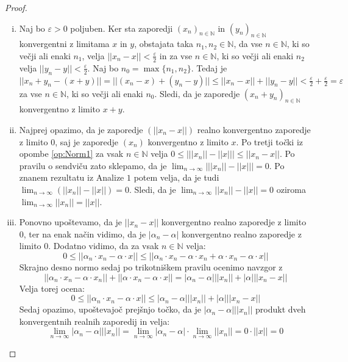 \documentclass[a4paper, 10pt]{article}
\newcounter{opombe}
\newcommand{\abs}[1]{\ensuremath{\lvert #1 \rvert}}
\newcommand{\mth}[1]{\ensuremath{\mathbb{#1}}}
\newcommand{\N}{\mth{N}}
\newcommand{\norm}[1]{\abs{\abs{#1}}}
\begin{document}
		\begin{proof}
				\begin{enumerate}[i)]
						\item Naj bo $\varepsilon > 0$ poljuben. Ker sta zaporedji $\left(x_n\right)_{n\in\N}$ in $\left(y_n\right)_{n\in\N}$ konvergentni z limitama $x$ in $y$, obstajata taka $n_1, n_2\in\N$, da vse $n\in\N$, ki so večji ali enaki $n_1$, velja $\norm{x_n - x} < \frac{\varepsilon}{2}$ in za vse $n\in\N$, ki so večji ali enaki $n_2$ velja $\norm{y_n - y} < \frac{\varepsilon}{2}$. Naj bo $n_0 = \max\{n_1, n_2\}$. Tedaj je $\norm{x_n + y_n - (x + y)} = \norm{(x_n - x) + (y_n - y)} \leq \norm{x_n - x} + \norm{y_n - y} < \frac{\varepsilon}{2} + \frac{\varepsilon}{2} = \varepsilon$ za vse $n\in\N$, ki so večji ali enaki $n_0$. Sledi, da je zaporedje $\left(x_n + y_n\right)_{n\in\N}$ konvergentno z limito $x + y$.
						\item Najprej opazimo, da je zaporedje $\left(\norm{x_n - x}\right)$ realno konvergentno zaporedje z limito $0$, saj je zaporedje $\left(x_n\right)$ konvergentno z limito $x$. Po tretji točki iz opombe \ref{op:Norm1} za vsak $n\in\N$ velja $0 \leq \abs{\norm{x_n} - \norm{x}} \leq \norm{x_n - x}$. Po pravilu o sendviču zato sklepamo, da je $\lim_{n\to\infty}\abs{\norm{x_n} - \norm{x}} = 0$. Po znanem rezultatu iz Analize $1$ potem velja, da je tudi $\lim_{n\to\infty}(\norm{x_n} - \norm{x}) = 0$. Sledi, da je $\lim_{n\to\infty}\norm{x_n} - \norm{x} = 0$ oziroma $\lim_{n\to\infty}\norm{x_n} = \norm{x}$.
						\item Ponovno upoštevamo, da je $\norm{x_n - x}$ konvergentno realno zaporedje z limito $0$, ter na enak način vidimo, da je $\abs{\alpha_n - \alpha}$ konvergentno realno zaporedje z limito $0$. Dodatno vidimo, da za vsak $n\in\N$ velja: $$0 \leq \norm{\alpha_n\cdot x_n - \alpha\cdot x} \leq \norm{\alpha_n\cdot x_n - \alpha\cdot x_n + \alpha\cdot x_n - \alpha\cdot x}$$
						Skrajno desno normo sedaj po trikotniškem pravilu ocenimo navzgor z $$\norm{\alpha_n\cdot x_n - \alpha\cdot x_n} + \norm{\alpha\cdot x_n - \alpha\cdot x}=\abs{\alpha_n - \alpha}\norm{x_n} + \abs{\alpha}\norm{x_n - x}$$ Velja torej ocena: \begin{equation}
								\label{eq:Normlim3}
								0 \leq \norm{\alpha_n\cdot x_n - \alpha\cdot x} \leq \abs{\alpha_n - \alpha}\norm{x_n} + \abs{\alpha}\norm{x_n - x}
							\end{equation}
						Sedaj opazimo, upoštevajoč prejšnjo točko, da je $\abs{\alpha_n - \alpha}\norm{x_n}$ produkt dveh konvergentnih realnih zaporedij in velja: $$\lim_{n\to\infty}\abs{\alpha_n - \alpha}\norm{x_n} = \lim_{n\to\infty}\abs{\alpha_n - \alpha} \cdot \lim_{n\to\infty}\norm{x_n} = 0\cdot\norm{x} = 0$$

\end{enumerate}
\end{proof}
\end{document}
